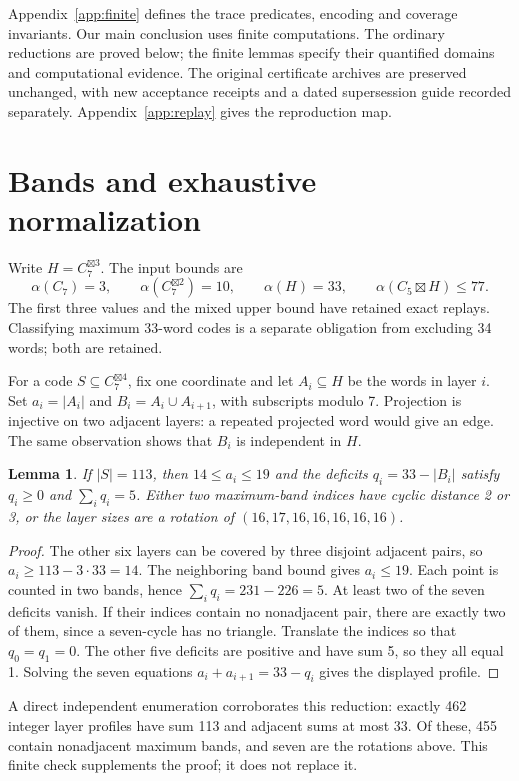 \documentclass[11pt]{article}
\newtheorem{lemma}[theorem]{Lemma}
\theoremstyle{definition}
\newcommand{\G}[1]{C_7^{\boxtimes #1}}
\begin{document}
Appendix~\ref{app:finite} defines the trace predicates, encoding and
coverage invariants. Our main conclusion uses finite computations.
The ordinary reductions are proved below; the finite lemmas specify their
quantified domains and computational evidence. The original certificate
archives are preserved unchanged, with new acceptance receipts and a dated
supersession guide recorded separately. Appendix~\ref{app:replay} gives
the reproduction map.

\section{Bands and exhaustive normalization}
Write $H=\G3$. The input bounds are
\[
 \alpha(C_7)=3,\qquad \alpha(\G2)=10,\qquad \alpha(H)=33,
 \qquad \alpha(C_5\boxtimes H)\leq77.
\]
The first three values and the mixed upper bound have retained exact
replays. Classifying maximum 33-word codes is a separate obligation from
excluding 34 words; both are retained.

For a code $S\subseteq\G4$, fix one coordinate and let $A_i\subseteq H$
be the words in layer $i$. Set $a_i=|A_i|$ and
$B_i=A_i\cup A_{i+1}$, with subscripts modulo 7. Projection is injective
on two adjacent layers: a repeated projected word would give an edge.
The same observation shows that $B_i$ is independent in $H$.

\begin{lemma}\label{lem:normal}
If $|S|=113$, then $14\leq a_i\leq19$ and the deficits
$q_i=33-|B_i|$ satisfy $q_i\geq0$ and $\sum_iq_i=5$.
Either two maximum-band indices have cyclic distance 2 or 3, or the layer
sizes are a rotation of $(16,17,16,16,16,16,16)$.
\end{lemma}
\begin{proof}
The other six layers can be covered by three disjoint adjacent pairs, so
$a_i\geq113-3\cdot33=14$. The neighboring band bound gives $a_i\leq19$.
Each point is counted in two bands, hence $\sum_iq_i=231-226=5$.
At least two of the seven deficits vanish. If their indices contain no
nonadjacent pair, there are exactly two of them, since a seven-cycle has
no triangle. Translate the indices so that $q_0=q_1=0$. The other five
deficits are positive and have sum 5, so they all equal 1. Solving the
seven equations $a_i+a_{i+1}=33-q_i$ gives the displayed profile.
\end{proof}

A direct independent enumeration corroborates this reduction: exactly 462
integer layer profiles have sum 113 and adjacent sums at most 33. Of these,
455 contain nonadjacent maximum bands, and seven are the rotations above.
This finite check supplements the proof; it does not replace it.
\end{document}
